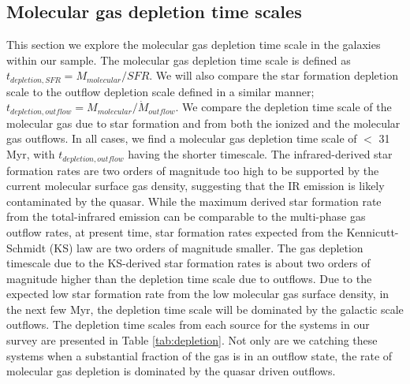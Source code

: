 \documentclass[twocolumn]{aastex63}
\begin{document}
\subsection{Molecular gas depletion time scales}

This section we explore the molecular gas depletion time scale in the galaxies within our sample. The molecular gas depletion time scale is defined as $t_{depletion, SFR} = M_{molecular}/SFR$. We will also compare the star formation depletion scale to the outflow depletion scale defined in a similar manner; $t_{depletion, outflow} = M_{molecular}/\dot{M}_{outflow}$. We compare the depletion time scale of the molecular gas due to star formation and from both the ionized and the molecular gas outflows. In all cases, we find a molecular gas depletion time scale of $<$ 31 Myr, with $t_{depletion, outflow}$ having the shorter timescale. The infrared-derived star formation rates are two orders of magnitude too high to be supported by the current molecular surface gas density, suggesting that the IR emission is likely contaminated by the quasar. While the maximum derived star formation rate from the total-infrared emission can be comparable to the multi-phase gas outflow rates, at present time, star formation rates expected from the Kennicutt-Schmidt (KS) law are two orders of magnitude smaller. The gas depletion timescale due to the KS-derived star formation rates is about two orders of magnitude higher than the depletion time scale due to outflows. Due to the expected low star formation rate from the low molecular gas surface density, in the next few Myr, the depletion time scale will be dominated by the galactic scale outflows. The depletion time scales from each source for the systems in our survey are presented in Table \ref{tab:depletion}. Not only are we catching these systems when a substantial fraction of the gas is in an outflow state, the rate of molecular gas depletion is dominated by the quasar driven outflows.
\end{document}
